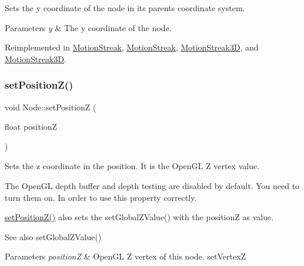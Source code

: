 Sets the y coordinate of the node in its parent\textquotesingle{}s coordinate system.


\begin{DoxyParams}{Parameters}
{\em y} & The y coordinate of the node. \\
\hline
\end{DoxyParams}


Reimplemented in \hyperlink{classMotionStreak_a75b545604e6a5f2351f6d4b034edb185}{Motion\+Streak}, \hyperlink{classMotionStreak_a78b4896032c6ef6e21ce5d9012d82d13}{Motion\+Streak}, \hyperlink{classMotionStreak3D_a8f63bcfa700cf9d67907d9e6f31bace6}{Motion\+Streak3D}, and \hyperlink{classMotionStreak3D_afb3de2f3e93486b5be3877d081159d57}{Motion\+Streak3D}.

\mbox{\label{classNode_aaea9bcbb6e5972122c590b930b5a90b9}} 
\subsubsection{\texorpdfstring{set\+Position\+Z()}{setPositionZ()}\hspace{0.1cm}{\footnotesize\ttfamily [1/2]}}
{\footnotesize\ttfamily void Node\+::set\+PositionZ (\begin{DoxyParamCaption}\item[{float}]{positionZ }\end{DoxyParamCaption})\hspace{0.3cm}{\ttfamily [virtual]}}

Sets the \textquotesingle{}z\textquotesingle{} coordinate in the position. It is the Open\+GL Z vertex value.

The Open\+GL depth buffer and depth testing are disabled by default. You need to turn them on. In order to use this property correctly.

{\ttfamily \hyperlink{classNode_aaea9bcbb6e5972122c590b930b5a90b9}{set\+Position\+Z()}} also sets the {\ttfamily set\+Global\+Z\+Value()} with the positionZ as value.

\begin{DoxySeeAlso}{See also}
{\ttfamily set\+Global\+Z\+Value()}
\end{DoxySeeAlso}

\begin{DoxyParams}{Parameters}
{\em positionZ} & Open\+GL Z vertex of this node.  set\+VertexZ \\
\hline
\end{DoxyParams}


